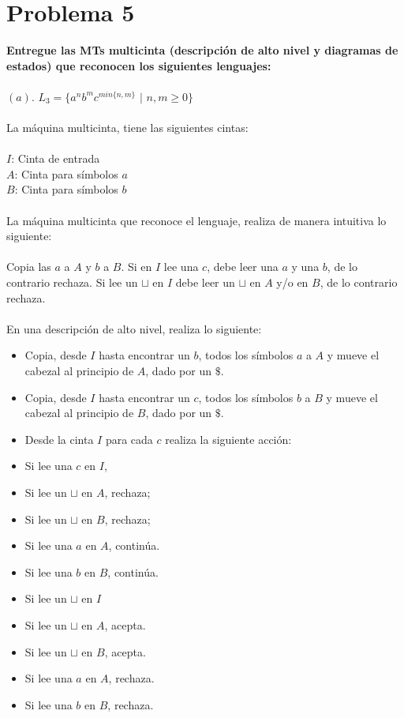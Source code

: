 \documentclass[spanish]{article}
\begin{document}
\section{Problema 5}
\textbf{Entregue las MTs multicinta (descripción de alto nivel y diagramas de estados) que reconocen los siguientes lenguajes:}
\\\\
$(a)$. $L_3 = \{a^nb^mc^{min\{n,m\}}$ $|$ $n,m \geq 0 \}$
\\\\
La máquina multicinta, tiene las siguientes cintas:
\\\\
$I$: Cinta de entrada\\
$A$: Cinta para símbolos $a$\\
$B$: Cinta para símbolos $b$
\\\\
La máquina multicinta que reconoce el lenguaje, realiza de manera intuitiva lo siguiente:
\\\\
Copia las $a$ a $A$ y $b$ a $B$. Si en $I$ lee una $c$, debe leer una $a$ y una $b$, de lo contrario rechaza. Si lee un $\sqcup$ en $I$ debe leer un $\sqcup$ en $A$ y/o en $B$, de lo contrario rechaza.
\\\\
En una descripción de alto nivel, realiza lo siguiente:
\begin{itemize}
\item Copia, desde $I$ hasta encontrar un $b$, todos los símbolos $a$ a $A$ y mueve el cabezal al principio de $A$, dado por un $\$$.
\item Copia, desde $I$ hasta encontrar un $c$, todos los símbolos $b$ a $B$ y mueve el cabezal al principio de $B$, dado por un $\$$.
\item Desde la cinta $I$ para cada $c$ realiza la siguiente acción:
\item \tab Si lee una $c$ en $I$,
\item \tab \tab Si lee un $\sqcup$ en $A$, rechaza; 
\item \tab \tab Si lee un $\sqcup$ en $B$, rechaza; 
\item \tab \tab Si lee una $a$ en $A$, continúa.
\item \tab \tab Si lee una $b$ en $B$, continúa.
\item \tab Si lee un $\sqcup$ en $I$
\item \tab \tab Si lee un $\sqcup$ en $A$, acepta.
\item \tab \tab Si lee un $\sqcup$ en $B$, acepta.
\item \tab \tab Si lee una $a$ en $A$, rechaza.
\item \tab \tab Si lee una $b$ en $B$, rechaza.
\end{itemize}
\end{document}
